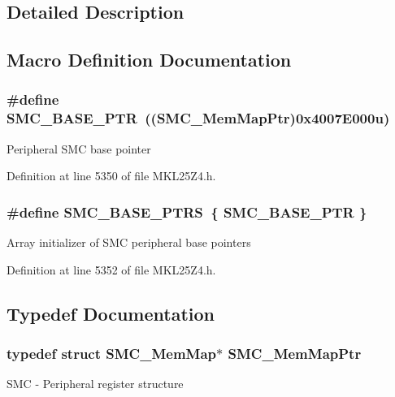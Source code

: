 \subsection{Detailed Description}


\subsection{Macro Definition Documentation}
\subsubsection[{\texorpdfstring{S\+M\+C\+\_\+\+B\+A\+S\+E\+\_\+\+P\+TR}{SMC_BASE_PTR}}]{\setlength{\rightskip}{0pt plus 5cm}\#define S\+M\+C\+\_\+\+B\+A\+S\+E\+\_\+\+P\+TR~(({\bf S\+M\+C\+\_\+\+Mem\+Map\+Ptr})0x4007\+E000u)}\hypertarget{group___s_m_c___peripheral_ga31b6c4571795341e6446800243313e56}{}\label{group___s_m_c___peripheral_ga31b6c4571795341e6446800243313e56}
Peripheral S\+MC base pointer 

Definition at line 5350 of file M\+K\+L25\+Z4.\+h.

\subsubsection[{\texorpdfstring{S\+M\+C\+\_\+\+B\+A\+S\+E\+\_\+\+P\+T\+RS}{SMC_BASE_PTRS}}]{\setlength{\rightskip}{0pt plus 5cm}\#define S\+M\+C\+\_\+\+B\+A\+S\+E\+\_\+\+P\+T\+RS~\{ {\bf S\+M\+C\+\_\+\+B\+A\+S\+E\+\_\+\+P\+TR} \}}\hypertarget{group___s_m_c___peripheral_gae583f3f0917ee513adcac36dd042a5f3}{}\label{group___s_m_c___peripheral_gae583f3f0917ee513adcac36dd042a5f3}
Array initializer of S\+MC peripheral base pointers 

Definition at line 5352 of file M\+K\+L25\+Z4.\+h.



\subsection{Typedef Documentation}
\subsubsection[{\texorpdfstring{S\+M\+C\+\_\+\+Mem\+Map\+Ptr}{SMC_MemMapPtr}}]{\setlength{\rightskip}{0pt plus 5cm}typedef struct {\bf S\+M\+C\+\_\+\+Mem\+Map}$\ast$ {\bf S\+M\+C\+\_\+\+Mem\+Map\+Ptr}}\hypertarget{group___s_m_c___peripheral_ga763f87a6b8ebab7acb6dde639e6a47c7}{}\label{group___s_m_c___peripheral_ga763f87a6b8ebab7acb6dde639e6a47c7}
S\+MC -\/ Peripheral register structure 